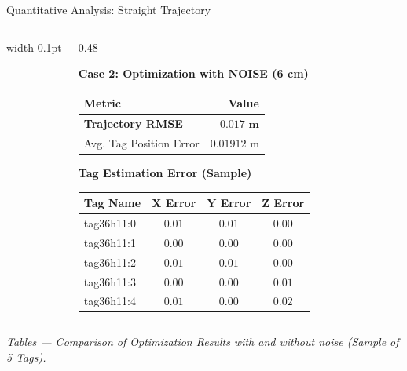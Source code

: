 \begin{frame}{Quantitative Analysis: Straight Trajectory}
\begin{columns}[T]
        \vrule width 0.1pt

        \begin{column}{0.48\textwidth}
            \centering
            \vspace{0.1cm}
            
            \textbf{Case 2: Optimization with NOISE (6 cm)}
            \vspace{0.1cm}
            
            \begin{tabular}{lr}
                \toprule
                \textbf{Metric} & \textbf{Value} \\
                \midrule
                \textbf{Trajectory RMSE} & $\mathbf{0.017 \text{ m}}$ \\
                Avg. Tag Position Error & $0.01912 \text{ m}$ \\
                \bottomrule
            \end{tabular}

            \vspace{0.3cm}
            
            \textbf{Tag Estimation Error (Sample)}
            \begin{tabular}{lccc}
                \toprule
                \textbf{Tag Name} & $\mathbf{X}$ \textbf{Error} & $\mathbf{Y}$ \textbf{Error} & $\mathbf{Z}$ \textbf{Error} \\
                \midrule
                tag36h11:0 & $0.01$ & $0.01$ & $0.00$ \\
                tag36h11:1 & $0.00$ & $0.00$ & $0.00$ \\
                tag36h11:2 & $0.01$ & $0.01$ & $0.00$ \\
                tag36h11:3 & $0.00$ & $0.00$ & $0.01$ \\
                tag36h11:4 & $0.01$ & $0.00$ & $0.02$ \\
                \bottomrule
            \end{tabular}
            
        \end{column}

    \end{columns}
    
    \begin{center}
        \textit{Tables — Comparison of Optimization Results with and without noise (Sample of 5 Tags).}
    \end{center}
\end{frame}


